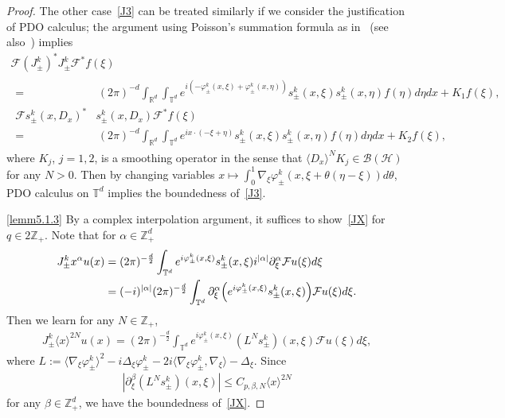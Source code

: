 \documentclass[10pt]{amsart}
\theoremstyle{definition}\newtheorem{defi}[theo]{Definition}\newtheorem{rema}[theo]{Remark}\newtheorem{exam}[theo]{Example}\newtheorem{exem}[theo]{Example}\newtheorem{nota}[theo]{Notation}
\renewcommand{\a}{\alpha}
\renewcommand{\b}{\beta}
\newcommand{\f}{\varphi}
\newcommand{\x}{\xi}
\newcommand{\R}{\mathbb{R}}
\newcommand{\Z}{\mathbb{Z}}
\newcommand{\T}{\mathbb{T}}
\newcommand{\HS}{\mathcal{H}}
\newcommand{\FS}{\mathcal{F}}
\newcommand{\BS}{\mathcal{B}}
\newcommand{\jap}[1]{\langle #1 \rangle}
\begin{document}
\begin{proof}
The other case~\eqref{J3} can be treated similarly if we consider the justification of PDO calculus; the argument using Poisson's summation formula as in~\cite[Lemma~7.1]{N3} (see also~\cite[Lemma~2.3]{T1}) implies
\begin{multline*}
\FS \left(J_\pm^k\right)^* J_\pm^k \FS^* f(\x) \\
\begin{aligned}
=&\,(2\pi)^{-d} \int_{\R^d} \int_{\T^d} e^{i\left(-\f_{\pm}^k(x,\x)+\f_{\pm}^k(x,\eta)\right)} s_\pm^k(x,\x) s_\pm^k(x,\eta) f(\eta) d\eta dx + K_1 f(\x), \\
\FS s_\pm^k(x,D_x)^* & s_\pm^k(x,D_x) \FS^* f(\x) \\
=&\,(2\pi)^{-d} \int_{\R^d} \int_{\T^d} e^{i x\cdot(-\x+\eta)} s_\pm^k(x,\x) s_\pm^k(x,\eta) f(\eta) d\eta dx + K_2 f(\x),
\end{aligned}
\end{multline*}
where $K_j$, $j=1,2$, is a smoothing operator in the sense that $\jap{D_x}^N K_j \in \BS(\HS)$ for any $N>0$. Then by changing variables $x\mapsto \int_0^1 \nabla_\x\f_\pm^k(x,\x+\theta(\eta-\x))d\theta$, PDO calculus on $\T^d$ implies the boundedness of~\eqref{J3}.

\eqref{lemm5.1.3} By a complex interpolation argument, it suffices to show~\eqref{JX} for $q\in 2\Z_+$. Note that for $\a\in\Z_+^d$
\begin{align*}
 J_\pm^k x^\a u(x) 
&= (2\pi)^{-\frac{d}{2}} \int_{\T^d} e^{i\f_{\pm}^k(x,\x)}s_\pm^k(x,\x) i^{|\a|}\partial_{\x}^\a \FS u(\x) d\x \\
&= (-i)^{|\a|} (2\pi)^{-\frac{d}{2}} \int_{\T^d} \partial_{\x}^\a \Bigl(e^{i\f_{\pm}^k(x,\x)} s_\pm^k(x,\x) \Bigr) \FS u(\x) d\x. 
\end{align*}
Then we learn for any $N\in\Z_+$,
\begin{align*}
J_\pm^k \jap{x}^{2N} u(x) = (2\pi)^{-\frac{d}{2}} \int_{\T^d} e^{i\f_{\pm}^k(x,\x)} \left(L^{N}s_\pm^k\right)(x,\x) \FS u(\x) d\x,
\end{align*}
where $L := \jap{\nabla_\x\f_\pm^k}^2 - i\Delta_\x\f_\pm^k - 2i\jap{\nabla_\x\f_\pm^k,\nabla_\x} - \Delta_\x$. Since
\begin{align*}
\left|\partial_\x^\b\left(L^{N}s_\pm^k\right)(x,\x)\right| \leq C_{p,\b,N} \jap{x}^{2N}
\end{align*}
for any $\b\in\Z_+^d$, we have the boundedness of~\eqref{JX}.




\end{proof}
\end{document}

